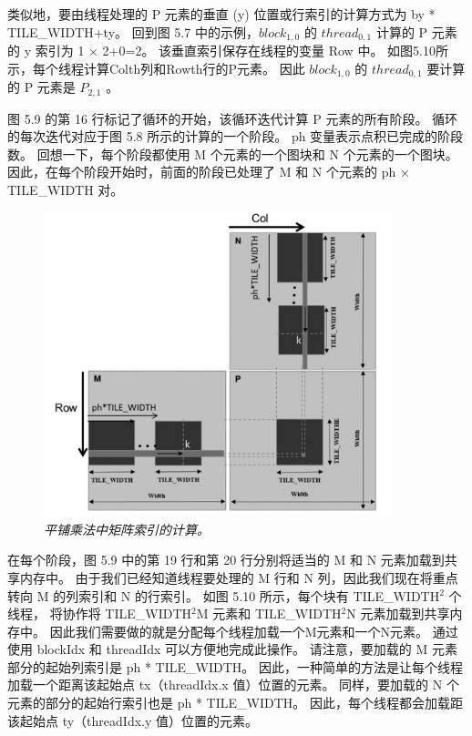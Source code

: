 类似地，要由线程处理的 P 元素的垂直 (y) 位置或行索引的计算方式为 by * TILE\_WIDTH+ty。 
回到图 5.7 中的示例，$block_{1,0}$ 的 $thread_{0,1}$ 计算的 P 元素的 y 索引为 1 × 2+0=2。 
该垂直索引保存在线程的变量 Row 中。  如图5.10所示，每个线程计算Colth列和Rowth行的P元素。 
因此 $block_{1,0}$ 的 $thread_{0,1}$ 要计算的 P 元素是 $P_{2,1}$ 。

图 5.9 的第 16 行标记了循环的开始，该循环迭代计算 P 元素的所有阶段。 
循环的每次迭代对应于图 5.8 所示的计算的一个阶段。 ph 变量表示点积已完成的阶段数。 
回想一下，每个阶段都使用 M 个元素的一个图块和 N 个元素的一个图块。 
因此，在每个阶段开始时，前面的阶段已处理了 M 和 N 个元素的 ph × TILE\_WIDTH 对。

\begin{figure}[H]
	\centering
	\includegraphics[width=0.9\textwidth]{figs/F5.10.png}
	\caption{\textit{平铺乘法中矩阵索引的计算。}}
\end{figure}

在每个阶段，图 5.9 中的第 19 行和第 20 行分别将适当的 M 和 N 元素加载到共享内存中。 
由于我们已经知道线程要处理的 M 行和 N 列，因此我们现在将重点转向 M 的列索引和 N 的行索引。
如图 5.10 所示，每个块有 TILE\_WIDTH$^2$ 个线程， 
将协作将 TILE\_WIDTH$^2$M 元素和 TILE\_WIDTH$^2$N 元素加载到共享内存中。 
因此我们需要做的就是分配每个线程加载一个M元素和一个N元素。 通过使用 blockIdx 和 threadIdx 可以方便地完成此操作。 
请注意，要加载的 M 元素部分的起始列索引是 ph * TILE\_WIDTH。 
因此，一种简单的方法是让每个线程加载一个距离该起始点 tx（threadIdx.x 值）位置的元素。 
同样，要加载的 N 个元素的部分的起始行索引也是 ph * TILE\_WIDTH。 
因此，每个线程都会加载距该起始点 ty（threadIdx.y 值）位置的元素。

